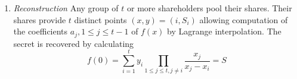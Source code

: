 \begin{algorithm}
\begin{enumerate}
\begin{enumerate}
   \end{enumerate}
   \item \textit{Reconstruction} Any group of $t$ or more shareholders pool their shares. Their shares provide $t$ distinct points $\left( x, y \right) = \left( i, S_i \right)$ allowing computation of the coefficients $a_j, 1 \leq j \leq t-1$ of $f \left( x \right)$ by Lagrange interpolation. The secret is recovered by calculating
 \begin{equation*}
  f \left( 0 \right) = \sum^t_{i=1}y_i \prod_{1 \leq j \leq t, j \neq i} \frac{x_j}{x_j-x_i} = S
 \end{equation*}
 \end{enumerate}
\end{algorithm}


